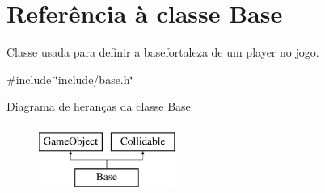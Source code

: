 \hypertarget{classBase}{}\section{Referência à classe Base}
\label{classBase}


Classe usada para definir a base\textquotesingle{}fortaleza\textquotesingle{} de um player no jogo.  




{\ttfamily \#include \char`\"{}include/base.\+h\char`\"{}}

Diagrama de heranças da classe Base\begin{figure}[H]
\begin{center}
\leavevmode
\includegraphics[height=2.000000cm]{classBase}
\end{center}
\end{figure}

